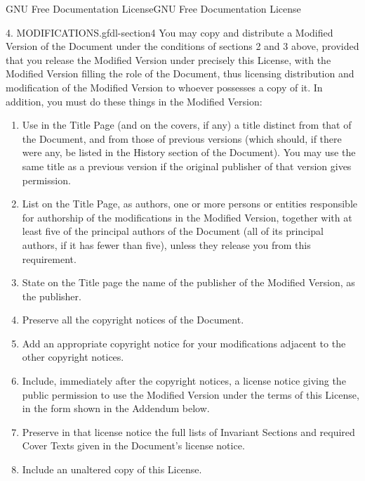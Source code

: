 \documentclass[10pt,]{book}
\numberwithin{equation}{section}
\begin{document}
\begin{appendixptx}{GNU Free Documentation License}{}{GNU Free Documentation License}{}{}
\begin{paragraphs}{4. MODIFICATIONS.}{gfdl-section4}%
\hypertarget{p-1329}{}%
You may copy and distribute a Modified Version of the Document under the conditions of sections 2 and 3 above, provided that you release the Modified Version under precisely this License, with the Modified Version filling the role of the Document, thus licensing distribution and modification of the Modified Version to whoever possesses a copy of it. In addition, you must do these things in the Modified Version:%
\leavevmode%
\begin{enumerate}[label=\Alph*.]
\item\hypertarget{li-105}{}\hypertarget{p-1330}{}%
Use in the Title Page (and on the covers, if any) a title distinct from that of the Document, and from those of previous versions (which should, if there were any, be listed in the History section of the Document). You may use the same title as a previous version if the original publisher of that version gives permission.%
\item\hypertarget{li-106}{}\hypertarget{p-1331}{}%
List on the Title Page, as authors, one or more persons or entities responsible for authorship of the modifications in the Modified Version, together with at least five of the principal authors of the Document (all of its principal authors, if it has fewer than five), unless they release you from this requirement.%
\item\hypertarget{li-107}{}\hypertarget{p-1332}{}%
State on the Title page the name of the publisher of the Modified Version, as the publisher.%
\item\hypertarget{li-108}{}\hypertarget{p-1333}{}%
Preserve all the copyright notices of the Document.%
\item\hypertarget{li-109}{}\hypertarget{p-1334}{}%
Add an appropriate copyright notice for your modifications adjacent to the other copyright notices.%
\item\hypertarget{li-110}{}\hypertarget{p-1335}{}%
Include, immediately after the copyright notices, a license notice giving the public permission to use the Modified Version under the terms of this License, in the form shown in the Addendum below.%
\item\hypertarget{li-111}{}\hypertarget{p-1336}{}%
Preserve in that license notice the full lists of Invariant Sections and required Cover Texts given in the Document's license notice.%
\item\hypertarget{li-112}{}\hypertarget{p-1337}{}%
Include an unaltered copy of this License.%

\end{enumerate}
\end{paragraphs}
\end{appendixptx}
\end{document}
